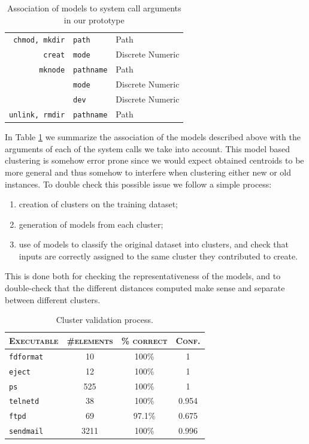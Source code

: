 \begin{table}[p]
\begin{tabular}{rll}
      \texttt{chmod, mkdir} & \texttt{path} & Path\\
      \texttt{creat} & \texttt{mode} & Discrete Numeric\\

      \texttt{mknode} & \texttt{pathname} & Path\\
      & \texttt{mode} & Discrete Numeric\\
      & \texttt{dev} & Discrete Numeric\\

      \texttt{unlink, rmdir} & \texttt{pathname} & Path\\
      \bottomrule
    \end{tabular}
    \caption{Association of models to system call arguments in our prototype}
  \label{tab:models-our-proto}
\end{table}

In Table \ref{tab:models-our-proto} we summarize the association of
the models described above with the arguments of each of the system
calls we take into account. This model based clustering is somehow
error prone since we would expect obtained centroids to be more
general and thus somehow to interfere when clustering either new or
old instances. To double check this possible issue we follow a simple
process:

\begin{enumerate}
\item creation of clusters on the training dataset;
\item generation of models from each cluster;
\item use of models to classify the original dataset into clusters,
  and check that inputs are correctly assigned to the same cluster
  they contributed to create.
\end{enumerate}

This is done both for checking the representativeness of the models,
and to double-check that the different distances computed make sense
and separate between different clusters.

\begin{table}[t]
  \centering
    \begin{tabular}{lccc}
      \toprule
      \textsc{Executable} & \textsc{\#elements} & \textsc{\% correct} & \textsc{Conf.}\\
      \midrule
      \texttt{fdformat} & 10 & 100\% & 1\\
      \texttt{eject} & 12 & 100\% & 1\\
      \texttt{ps} & 525 & 100\% & 1\\
      \texttt{telnetd} & 38 & 100\% & 0.954\\
      \texttt{ftpd} & 69 & 97.1\% & 0.675\\
      \texttt{sendmail} & 3211 & 100\% & 0.996\\
      \bottomrule
    \end{tabular}
  \caption{Cluster validation process.}
  \label{tab:cluster-validation}
\end{table}

